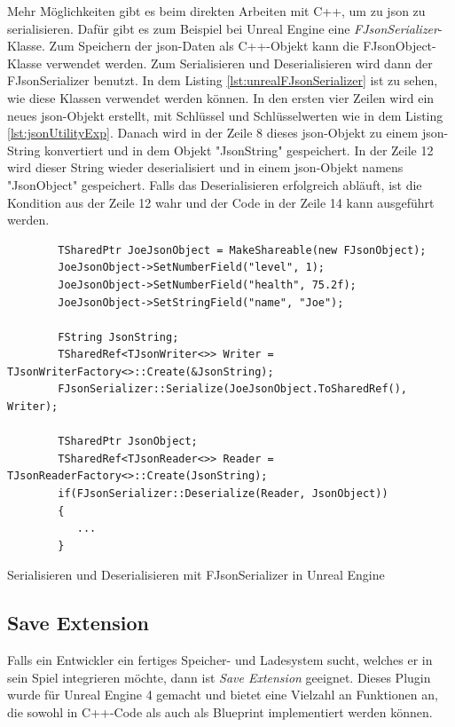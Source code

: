 Mehr Möglichkeiten gibt es beim direkten Arbeiten mit C++, um zu \ac{json} zu serialisieren. Dafür gibt es zum Beispiel bei Unreal Engine eine \textit{FJsonSerializer}-Klasse.\cite{unrealengineFJsonSerializer} Zum Speichern der \ac{json}-Daten als C++-Objekt kann die FJsonObject-Klasse verwendet werden.\cite{unrealengineFJsonObject} Zum Serialisieren und Deserialisieren wird dann der FJsonSerializer benutzt.\cite{unrealengineFJsonSerializer} In dem Listing \ref{lst:unrealFJsonSerializer} ist zu sehen, wie diese Klassen verwendet werden können. In den ersten vier Zeilen wird ein neues \ac{json}-Objekt erstellt, mit Schlüssel und Schlüsselwerten wie in dem Listing \ref{lst:jsonUtilityExp}. Danach wird in der Zeile 8 dieses \ac{json}-Objekt zu einem \ac{json}-String konvertiert und in dem Objekt "JsonString" gespeichert. In der Zeile 12 wird dieser String wieder deserialisiert und in einem \ac{json}-Objekt namens "JsonObject" gespeichert. Falls das Deserialisieren erfolgreich abläuft, ist die Kondition aus der Zeile 12 wahr und der Code in der Zeile 14 kann ausgeführt werden.\cite{wraiythUsingJson1}\cite{wraiythUsingJson2}

\begin{listing}[htp]
    \begin{verbatim}
        TSharedPtr JoeJsonObject = MakeShareable(new FJsonObject);
        JoeJsonObject->SetNumberField("level", 1);
        JoeJsonObject->SetNumberField("health", 75.2f);
        JoeJsonObject->SetStringField("name", "Joe");
        
        FString JsonString;
        TSharedRef<TJsonWriter<>> Writer = TJsonWriterFactory<>::Create(&JsonString);
        FJsonSerializer::Serialize(JoeJsonObject.ToSharedRef(), Writer);   
        
        TSharedPtr JsonObject;
        TSharedRef<TJsonReader<>> Reader = TJsonReaderFactory<>::Create(JsonString);
        if(FJsonSerializer::Deserialize(Reader, JsonObject)) 
        {
           ...
        }
    \end{verbatim}
    \caption{Serialisieren und Deserialisieren mit FJsonSerializer in Unreal Engine \cite{wraiythUsingJson1}\cite{wraiythUsingJson2}}
    \label{lst:unrealFJsonSerializer}
\end{listing}



\subsection{Save Extension}
Falls ein Entwickler ein fertiges Speicher- und Ladesystem sucht, welches er in sein Spiel integrieren möchte, dann ist \textit{Save Extension} geeignet. Dieses Plugin wurde für Unreal Engine 4 gemacht und bietet eine Vielzahl an Funktionen an, die sowohl in C++-Code als auch als Blueprint implementiert werden können.\cite{unrealengineSaveExtension}

